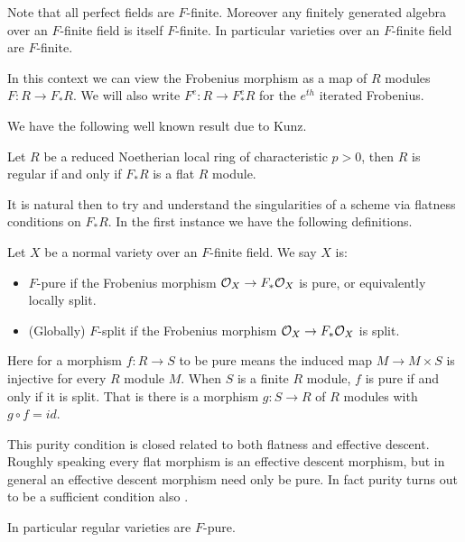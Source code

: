 Note that all perfect fields are $F$-finite. Moreover any finitely generated algebra over an $F$-finite field is itself $F$-finite. In particular varieties over an $F$-finite field are $F$-finite.

In this context we can view the Frobenius morphism as a map of $R$ modules $F:R \to F_{*}R$. We will also write $F^{e}:R \to F_{*}^{e}R$ for the $e^{th}$ iterated Frobenius.

We have the following well known result due to Kunz.

\begin{theorem}\cite[Tag 0EC0]{stacks-project}\cite{kunz1969characterizations}
	Let $R$ be a reduced Noetherian local ring of characteristic $p> 0$, then $R$ is regular if and only if $F_{*}R$ is a flat $R$ module.
\end{theorem}

It is natural then to try and understand the singularities of a scheme via flatness conditions on $F_{*}R$. In the first instance we have the following definitions.

\begin{definition}
	Let $X$ be a normal variety over an $F$-finite field.
	We say $X$ is:
	\begin{itemize}
		\item $F$-pure if the Frobenius morphism $\mathcal{O}_{X} \to F_{*}\mathcal{O}_{X}$ is pure, or equivalently locally split.
		\item (Globally) $F$-split if the Frobenius morphism $\mathcal{O}_{X} \to F_{*}\mathcal{O}_{X}$ is split.
	\end{itemize} 
\end{definition}

Here for a morphism $f:R \to S$ to be pure means the induced map $M \to M \times S$ is injective for every $R$ module $M$. When $S$ is a finite $R$ module, $f$ is pure if and only if it is split. That is there is a morphism $g:S \to R$ of $R$ modules with $g \circ f =id$.

\begin{remark}

	This purity condition is closed related to both flatness and effective descent. Roughly speaking every flat morphism is an effective descent morphism, but in general an effective descent morphism need only be pure. In fact purity turns out to be a sufficient condition also \cite[Tag 08WE]{stacks-project}.
	
	In particular regular varieties are $F$-pure.
	
	\end{remark}

